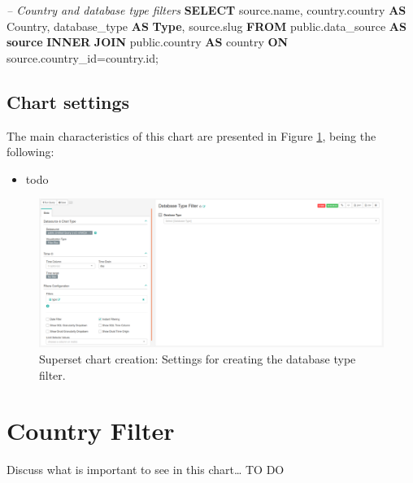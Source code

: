 \documentclass[]{book}
\newenvironment{Shaded}{\begin{snugshade}}{\end{snugshade}}
\newcommand{\KeywordTok}[1]{\textcolor[rgb]{0.13,0.29,0.53}{\textbf{#1}}}
\newcommand{\CommentTok}[1]{\textcolor[rgb]{0.56,0.35,0.01}{\textit{#1}}}
\newcommand{\NormalTok}[1]{#1}
\providecommand{\tightlist}{%
  \setlength{\itemsep}{0pt}\setlength{\parskip}{0pt}}
\begin{document}
\begin{Shaded}
\begin{Highlighting}[]
\CommentTok{--  Country and database type filters}
\KeywordTok{SELECT}\NormalTok{ source.name, }
\NormalTok{       country.country }\KeywordTok{AS}\NormalTok{ Country, }
\NormalTok{       database_type }\KeywordTok{AS} \KeywordTok{Type}\NormalTok{,}
\NormalTok{       source.slug}
\KeywordTok{FROM}\NormalTok{ public.data_source }\KeywordTok{AS} \KeywordTok{source} \KeywordTok{INNER} \KeywordTok{JOIN}\NormalTok{ public.country }
    \KeywordTok{AS}\NormalTok{ country }\KeywordTok{ON}\NormalTok{ source.country_id=country.id;}
\end{Highlighting}
\end{Shaded}

\subsection{Chart settings}\label{chart-settings}

The main characteristics of this chart are presented in Figure
\ref{fig:databaseTypeFilter}, being the following:

\begin{itemize}
\tightlist
\item
  todo
\end{itemize}

\begin{figure}
\includegraphics[width=1\linewidth]{images/databaseTypeFilter} \caption{Superset chart creation: Settings for creating the database type filter.}\label{fig:databaseTypeFilter}
\end{figure}

\section{Country Filter}\label{country-filter}

Discuss what is important to see in this chart\ldots{} TO DO
\end{document}
